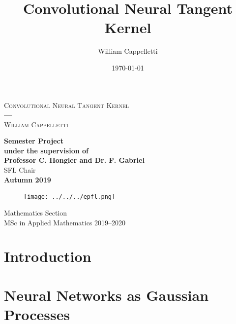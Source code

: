 \documentclass[11pt,notitlepage]{article}
\title{Convolutional Neural Tangent Kernel}
\author{William Cappelletti}
\date{\today}
\numberwithin{equation}{section}
\theoremstyle{remark}
\theoremstyle{definition}
\begin{document}
	\begin{titlepage}
		\centering
		\vspace*{0.6cm}
		{\Huge \textsc{Convolutional Neural Tangent Kernel\\}}
		\vspace*{0.3cm}
		\textbf{---}\\
		\vspace*{0.3cm}
		{\Large \textsc{William Cappelletti\\}}
		\vspace*{1cm}
		
		\begin{abstract}
			\lipsum[2]
		\end{abstract}
		
		
		\vspace*{1.75cm}
		{\large \textbf{Semester Project\\
				\vspace*{0.1cm}
				under the supervision of\\
				Professor C. Hongler and Dr. F. Gabriel}\\}
		\vspace*{0.2cm}
		SFL Chair\\
		\vspace*{1cm}
		\textbf{Autumn 2019}\\
		\begin{figure}[h]
			\begin{center}
				\texttt{[image: ../../../epfl.png]}
			\end{center}
		\end{figure}
		Mathematics Section\\
		MSc in Applied Mathematics 2019--2020
		
		
	
	\end{titlepage}
	
	\tableofcontents		
	
	\newpage
		
	\section{Introduction}\label{sec:Introduction}
	
    \section{Neural Networks as Gaussian Processes}\label{sec:Definitions}
\end{document}
